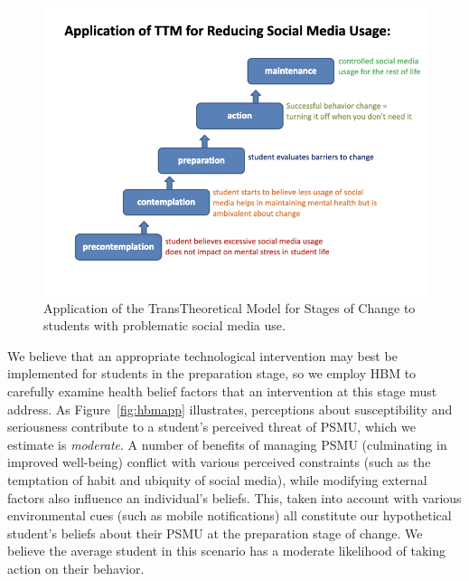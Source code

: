\documentclass[
  man]{apa6}
\begin{document}
\begin{figure}
\centering
\includegraphics{ttmapplied.jpeg}
\caption{\label{fig:ttmapp}Application of the TransTheoretical Model for Stages of Change to students with problematic social media use.}
\end{figure}

We believe that an appropriate technological intervention may best be implemented
for students in the preparation stage, so we employ HBM to carefully examine
health belief factors that an intervention at this stage must address. As
Figure~\ref{fig:hbmapp} illustrates, perceptions about susceptibility and
seriousness contribute to a student's perceived threat of PSMU, which we
estimate is \emph{moderate}. A number of benefits of managing PSMU (culminating in
improved well-being) conflict with various perceived constraints (such as the
temptation of habit and ubiquity of social media), while modifying external
factors also influence an individual's beliefs. This, taken into account with
various environmental cues (such as mobile notifications) all constitute our
hypothetical student's beliefs about their PSMU at the preparation stage of
change. We believe the average student in this scenario has a moderate likelihood
of taking action on their behavior.
\end{document}
